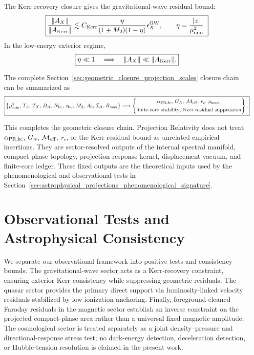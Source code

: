 \documentclass[11pt]{article}
\begin{document}
The Kerr recovery closure gives the gravitational-wave residual bound:
\begin{equation}
\boxed{
\frac{\|A_X\|}{\|A_{\rm Kerr}\|}
\lesssim
C_{\rm Kerr}
\frac{\eta}{(1+M_2)(1-\eta)}
\epsilon_X^{\rm GW},
\qquad
\eta=\frac{|z|}{\mu_{\min}^2}.
}
\end{equation}
In the low-energy exterior regime,
\begin{equation}
\boxed{
\eta\ll1
\quad
\Longrightarrow
\quad
\|A_X\|\ll\|A_{\rm Kerr}\|.
}
\end{equation}

The complete Section~\ref{sec:geometric_closure_projection_scales} closure chain
can be summarized as
\small{
\begin{equation}
\boxed{
\left\{
\mu_{\min}^2,\, T_A,\, T_X,\, D_A,\, N_{\rm bc},\, c_{\rm bc},\, M_2,\, A_0,\, \mathcal I_A,\, R_{\max}
\right\}
\longrightarrow
\left\{
\begin{array}{@{}c@{}}
\alpha_{{\rm PR},bc},\, G_N,\, \mathcal M_{\rm eff},\, r_c,\, \rho_{\max}, \\[1ex]
\text{finite-core stability},\, \text{Kerr residual suppression}
\end{array}
\right\}.
}
\end{equation}}

This completes the geometric closure chain. Projection Relativity does not treat
\(\alpha_{{\rm PR},bc}\), \(G_N\), \(\mathcal M_{\rm eff}\), \(r_c\), or the
Kerr residual bound as unrelated empirical insertions. They are sector-resolved
outputs of the internal spectral manifold, compact phase topology, projection
response kernel, displacement vacuum, and finite-core ledger. These fixed
outputs are the theoretical inputs used by the phenomenological and
observational tests in Section~\ref{sec:astrophysical_projections_phenomenological_signature}.

\section{Observational Tests and Astrophysical Consistency}
\label{sec:observational_tests}
\label{sec:astrophysical_projections_phenomenological_signature}
We separate our observational framework into positive tests and consistency bounds. The gravitational-wave sector acts as a Kerr-recovery constraint, ensuring exterior Kerr-consistency while suppressing geometric residuals. The quasar sector provides the primary direct support via luminosity-linked velocity residuals stabilized by low-ionization anchoring. Finally, foreground-cleaned Faraday residuals in the magnetic sector establish an inverse constraint on the projected compact-phase area rather than a universal fixed magnetic amplitude. The cosmological sector is treated separately as a joint density–pressure and directional-response stress test; no dark-energy detection, deceleration detection, or Hubble-tension resolution is claimed in the present work.
\end{document}
